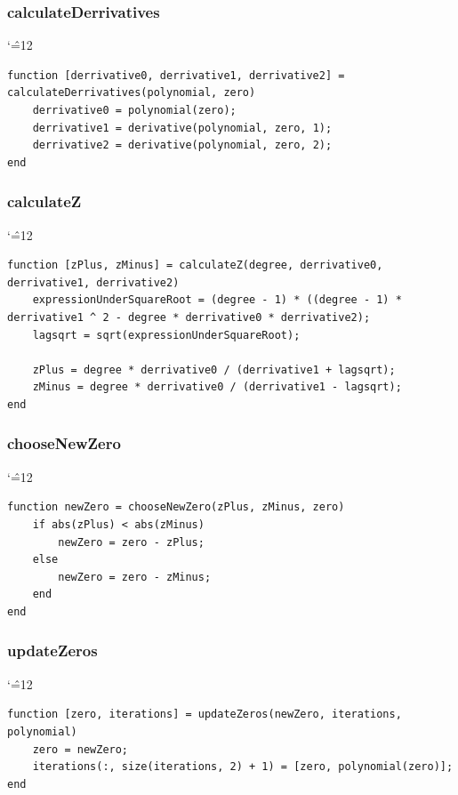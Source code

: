\documentclass[12pt]{report}
\newenvironment{simplechar}{%
   \catcode`\^=12
}{}
\begin{document}
\newpage
\subsubsection{calculateDerrivatives}
\begin{simplechar}
\begin{lstlisting}
function [derrivative0, derrivative1, derrivative2] = calculateDerrivatives(polynomial, zero)
    derrivative0 = polynomial(zero);
    derrivative1 = derivative(polynomial, zero, 1);
    derrivative2 = derivative(polynomial, zero, 2);
end
\end{lstlisting}
\end{simplechar}

\subsubsection{calculateZ}
\begin{simplechar}
\begin{lstlisting}
function [zPlus, zMinus] = calculateZ(degree, derrivative0, derrivative1, derrivative2)
    expressionUnderSquareRoot = (degree - 1) * ((degree - 1) * derrivative1 ^ 2 - degree * derrivative0 * derrivative2);
    lagsqrt = sqrt(expressionUnderSquareRoot);

    zPlus = degree * derrivative0 / (derrivative1 + lagsqrt);
    zMinus = degree * derrivative0 / (derrivative1 - lagsqrt);
end
\end{lstlisting}
\end{simplechar}

\subsubsection{chooseNewZero}
\begin{simplechar}
\begin{lstlisting}
function newZero = chooseNewZero(zPlus, zMinus, zero)
    if abs(zPlus) < abs(zMinus)
        newZero = zero - zPlus;
    else
        newZero = zero - zMinus;
    end
end
\end{lstlisting}
\end{simplechar}

\newpage
\subsubsection{updateZeros}
\begin{simplechar}
\begin{lstlisting}
function [zero, iterations] = updateZeros(newZero, iterations, polynomial)
    zero = newZero;
    iterations(:, size(iterations, 2) + 1) = [zero, polynomial(zero)];
end
\end{lstlisting}
\end{simplechar}
\end{document}
